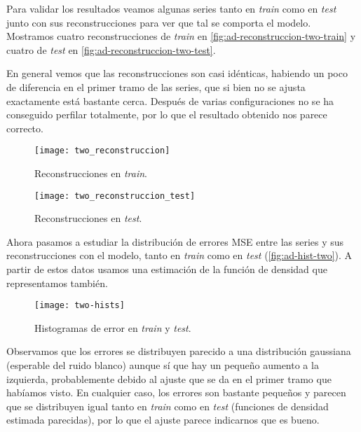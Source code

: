 Para validar los resultados veamos algunas series tanto en \emph{train} como en \emph{test} junto con sus reconstrucciones para ver que tal se comporta el modelo.
Mostramos cuatro reconstrucciones de \emph{train} en \autoref{fig:ad-reconstruccion-two-train} y cuatro de \emph{test} en \autoref{fig:ad-reconstruccion-two-test}.

En general vemos que las reconstrucciones son casi idénticas, habiendo un poco de diferencia en el primer tramo de las series, que si bien no se ajusta exactamente está bastante cerca. Después de varias configuraciones no se ha conseguido perfilar totalmente, por lo que el resultado obtenido nos parece correcto.

\begin{figure}[htpb]
  \centering
  \texttt{[image: two\_reconstruccion]}
  \caption{Reconstrucciones en \emph{train}.}
  \label{fig:ad-reconstruccion-two-train}
\end{figure}

\begin{figure}[htpb]
  \centering
  \texttt{[image: two\_reconstruccion\_test]}
  \caption{Reconstrucciones en \emph{test}.}
  \label{fig:ad-reconstruccion-two-test}
\end{figure}

Ahora pasamos a estudiar la distribución de errores MSE entre las series y sus reconstrucciones con el modelo, tanto en \emph{train} como en \emph{test} (\autoref{fig:ad-hist-two}). A partir de estos datos usamos una estimación de la función de densidad que representamos también.

\begin{figure}[htpb]
  \centering
  \texttt{[image: two-hists]}
  \caption{Histogramas de error en \emph{train} y \emph{test}.}
  \label{fig:ad-hist-two}
\end{figure}

Observamos que los errores se distribuyen parecido a una distribución gaussiana (esperable del ruido blanco) aunque sí que hay un pequeño aumento a la izquierda, probablemente debido al ajuste que se da en el primer tramo que habíamos visto. En cualquier caso, los errores son bastante pequeños y parecen que se distribuyen igual tanto en \emph{train} como en \emph{test} (funciones de densidad estimada parecidas), por lo que el ajuste parece indicarnos que es bueno.

